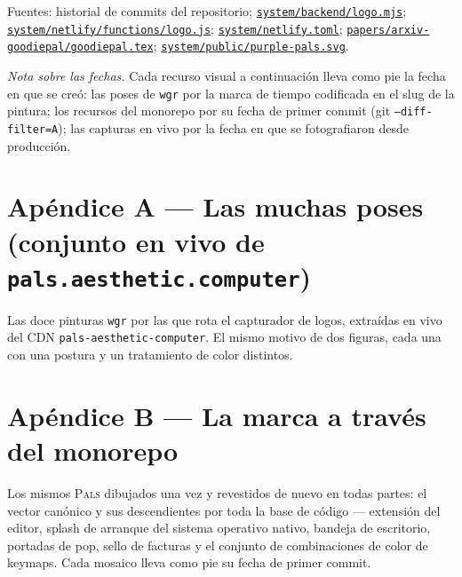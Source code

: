 \documentclass[10pt,letterpaper,twocolumn]{article}
\newcommand{\pals}{\textsc{Pals}}
\newcommand{\repofile}[1]{\href{https://github.com/whistlegraph/aesthetic-computer/blob/main/#1}{\texttt{#1}}}
\begin{document}
\vspace{0.6em}
{\footnotesize\color{acgray}\noindent Fuentes: historial de commits del
repositorio;
\repofile{system/backend/logo.mjs};
\repofile{system/netlify/functions/logo.js};
\repofile{system/netlify.toml};
\repofile{papers/arxiv-goodiepal/goodiepal.tex};
\repofile{system/public/purple-pals.svg}.\par}

\onecolumn
\appendix

\noindent\emph{Nota sobre las fechas.} Cada recurso visual a continuación
lleva como pie la fecha en que se creó: las poses de \texttt{wgr} por la marca
de tiempo codificada en el slug de la pintura; los recursos del monorepo por
su fecha de primer commit (git \texttt{--diff-filter=A}); las capturas en vivo
por la fecha en que se fotografiaron desde producción.

\section*{Apéndice A --- Las muchas poses (conjunto en vivo de \texttt{pals.aesthetic.computer})}
\noindent Las doce pinturas \texttt{wgr} por las que rota el capturador de
logos, extraídas en vivo del CDN \texttt{pals-aesthetic-computer}. El mismo
motivo de dos figuras, cada una con una postura y un tratamiento de color
distintos.
\vspace{1.2em}




\newpage
\section*{Apéndice B --- La marca a través del monorepo}
\noindent Los mismos \pals{} dibujados una vez y revestidos de nuevo en todas
partes: el vector canónico y sus descendientes por toda la base de código ---
extensión del editor, splash de arranque del sistema operativo nativo, bandeja
de escritorio, portadas de pop, sello de facturas y el conjunto de
combinaciones de color de keymaps. Cada mosaico lleva como pie su fecha de
primer commit.
\vspace{1.2em}



\newpage
\end{document}
